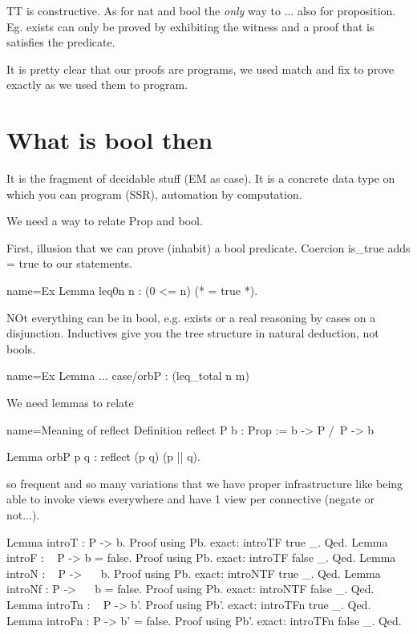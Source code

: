 TT is constructive.  As for nat and bool the \emph{only} way
to ... also for proposition. Eg. exists can only be proved
by exhibiting the witness and a proof that is satisfies the predicate.

It is pretty clear that our proofs are programs, we used match and fix
to prove exactly as we used them to program.

\section{What is bool then}

It is the fragment of decidable stuff (EM as case).
It is a concrete data type on which you can program (SSR), automation by
computation.

% 


We need a way to relate Prop and bool.

First, illusion that we can prove (inhabit) a bool predicate.
Coercion is\_true adds = true to our statements.

\begin{coq}{name=Ex}{}
Lemma leq0n n : (0 <= n) (* = true *).
\end{coq}

NOt everything can be in bool, e.g. exists or a real reasoning by cases
on a disjunction. Inductives give you the tree structure in natural
deduction, not bools.

\begin{coq}{name=Ex}{}
Lemma ...
case/orbP : (leq_total n m)
\end{coq}

We need lemmas to relate

\begin{coq}{name=Meaning of reflect}{}
Definition reflect P b : Prop :=  b -> P /\ P -> b

Lemma orbP p q : reflect (p \/ q) (p || q).
\end{coq}

so frequent and so many variations that we have proper infrastructure like
being able to invoke views everywhere and have 1 view per connective (negate or
not...).

\begin{coq}{}{}
Lemma introT  : P -> b.            Proof using Pb. exact: introTF true _. Qed.
Lemma introF  : ~ P -> b = false.  Proof using Pb. exact: introTF false _. Qed.
Lemma introN  : ~ P -> ~~ b.       Proof using Pb. exact: introNTF true _. Qed.
Lemma introNf : P -> ~~ b = false. Proof using Pb. exact: introNTF false _. Qed.
Lemma introTn : ~ P -> b'.         Proof using Pb'. exact: introTFn true _. Qed.
Lemma introFn : P -> b' = false.   Proof using Pb'. exact: introTFn false _. Qed.
\end{coq}

